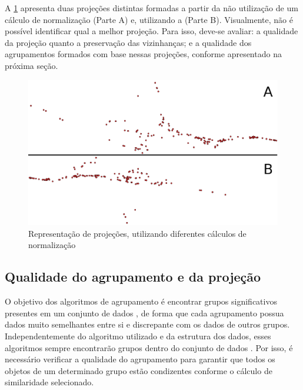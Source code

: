 			A \cref{fig:projecoes} apresenta duas projeções distintas formadas a partir da
			não utilização de um cálculo de normalização (Parte A) e, utilizando a
			 (Parte B). Visualmente, não é possível identificar qual
			a melhor projeção. Para isso, deve-se avaliar: a qualidade da projeção quanto %
			a preservação das vizinhanças; e a qualidade dos agrupamentos formados com base
			nessas projeções, conforme apresentado na próxima seção.
						
			\begin{figure}[h]
				\centering
				\includegraphics[width=0.7\linewidth]{imagem/projecoes}
				\caption{Representação de projeções, utilizando diferentes cálculos de normalização}
				\label{fig:projecoes}
				
			\end{figure}
			
		
		\subsection{Qualidade do agrupamento e da projeção}
		\label{subsec:qualidade}
			O objetivo dos algoritmos de agrupamento é encontrar grupos significativos
			presentes em um conjunto de dados \cite{Halkidi2001}, de forma que cada agrupamento
			possua dados muito semelhantes entre si e discrepante com os dados de outros grupos.
			Independentemente do algoritmo utilizado e da estrutura dos dados,
			esses algoritmos sempre encontrarão grupos dentro do conjunto de dados
			\cite{Tan:2005:ch8}. Por isso, é necessário verificar a qualidade do
			agrupamento para garantir que todos os objetos de um determinado grupo
			estão condizentes conforme o cálculo de similaridade selecionado.
			
